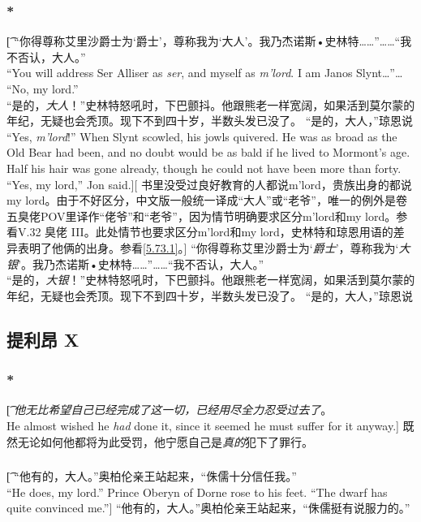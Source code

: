\documentclass[12pt,a4paper]{article}
\begin{document}
\subsubsection{\color{red}*}\label{5.69.1}\t[
	“你得尊称艾里沙爵士为‘爵士’，尊称我为‘大人’。我乃杰诺斯•史林特……”……“我不否认，大人。”\\
	“You will address Ser Alliser as \emph{ser}, and myself as \emph{m'lord}. I am Janos Slynt\ldots”\ldots
	 “No, my lord.”\\
	“是的，\emph{大人}！”史林特怒吼时，下巴颤抖。他跟熊老一样宽阔，如果活到莫尔蒙的年纪，无疑也会秃顶。现下不到四十岁，半数头发已没了。
	“是的，大人，”琼恩说\\
	“Yes, \emph{m'lord}!” When Slynt scowled, his jowls quivered. He was as broad as the Old Bear had been, and no doubt would be as bald if he lived to Mormont's age. Half his hair was gone already, though he could not have been more than forty.
	“Yes, my lord,” Jon said.][
	书里没受过良好教育的人都说m'lord，贵族出身的都说my lord。由于不好区分，中文版一般统一译成“大人”或“老爷”，唯一的例外是卷五臭佬POV里译作“佬爷”和“老爷”，因为情节明确要求区分m'lord和my lord。参看V.32 臭佬 III。此处情节也要求区分m'lord和my lord，史林特和琼恩用语的差异表明了他俩的出身。参看\ref{5.73.1}。]
	“你得尊称艾里沙爵士为‘\emph{爵士}’，尊称我为‘\emph{大银}’。我乃杰诺斯•史林特……”……“我不否认，大人。”\\
	“是的，\emph{大银}！”史林特怒吼时，下巴颤抖。他跟熊老一样宽阔，如果活到莫尔蒙的年纪，无疑也会秃顶。现下不到四十岁，半数头发已没了。
	“是的，大人，”琼恩说
	
	
\subsection{提利昂 X}
\subsubsection{\color{red}*}\t[
	\emph{他无比希望自己已经完成了这一切，已经用尽全力忍受过去了}。\\
	He almost wished he \emph{had} done it, since it seemed he must suffer for it anyway.]
	既然无论如何他都将为此受罚，他宁愿自己是\emph{真的}犯下了罪行。
	
\subsubsection{}\t[
	“他有的，大人。”奥柏伦亲王站起来，“侏儒十分信任我。”\\
	“He does, my lord.” Prince Oberyn of Dorne rose to his feet. “The dwarf has quite convinced me.”]
	“他有的，大人。”奥柏伦亲王站起来，“侏儒挺有说服力的。”	
	
\end{document}

